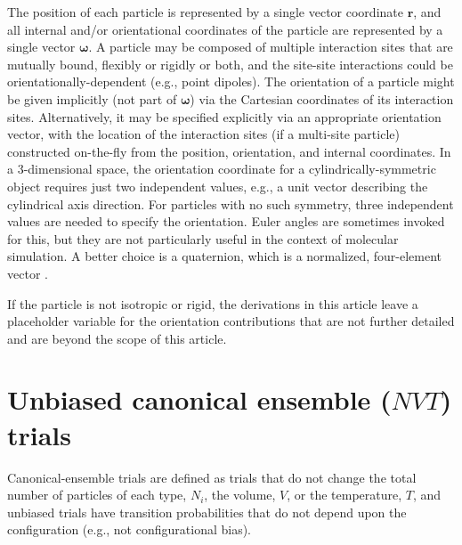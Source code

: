 \documentclass[
  9pt,
  bestpractices,
  pubversion,
]{livecoms}
\begin{document}
The position of each particle is represented by a single vector coordinate $\mathbf{r}$, and all internal and/or orientational coordinates of the particle are represented by a single vector $\boldsymbol{\omega}$.
A particle may be composed of multiple interaction sites that are mutually bound, flexibly or rigidly or both, and the site-site interactions could be orientationally-dependent (e.g., point dipoles).
The orientation of a particle might be given implicitly (not part of $\boldsymbol{\omega}$) via the Cartesian coordinates of its interaction sites.
Alternatively, it may be specified explicitly via an appropriate orientation vector, with the location of the interaction sites (if a multi-site particle) constructed on-the-fly from the position, orientation, and internal coordinates.
In a 3-dimensional space, the orientation coordinate for a cylindrically-symmetric object requires just two independent values, e.g., a unit  vector describing the cylindrical axis direction.
For particles with no such symmetry, three independent values are needed to specify the orientation.
Euler angles are sometimes invoked for this, but they are not particularly useful in the context of molecular simulation.
A better choice is a quaternion, which is a normalized, four-element vector \cite{vesely_angular_1982, karney_quaternions_2007}.

If the particle is not isotropic or rigid, the derivations in this article leave a placeholder variable for the orientation contributions that are not further detailed and are beyond the scope of this article.

\section{\label{sec:rhs_nvt}Unbiased canonical ensemble ($NVT$) trials}

Canonical-ensemble trials are defined as trials that do not change the total number of particles of each type, $N_i$, the volume, $V$, or the temperature, $T$, and unbiased trials have transition probabilities that do not depend upon the configuration (e.g., not configurational bias).
\end{document}
